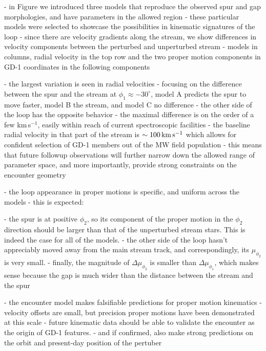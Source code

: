 \documentclass[12pt, modern]{aastex62}
\begin{document}
- in Figure we introduced three models that reproduce the observed spur and gap morphologies, and have parameters in the allowed region
- these particular models were selected to showcase the possibilities in kinematic signatures of the loop
- since there are velocity gradients along the stream, we show differences in velocity components between the perturbed and unperturbed stream
- models in columns, radial velocity in the top row and the two proper motion components in GD-1 coordinates in the following components

- the largest variation is seen in radial velocities
- focusing on the difference between the spur and the stream at $\phi_1\approx-30^\circ$, model A predicts the spur to move faster, model B the stream, and model C no difference
- the other side of the loop has the opposite behavior
- the maximal difference is on the order of a few km\,s$^{-1}$, easily within reach of current spectroscopic facilities
- the baseline radial velocity in that part of the stream is $\sim100\,\rm km\,s^{-1}$ which allows for confident selection of GD-1 members out of the MW field population
- this means that future followup observations will further narrow down the allowed range of parameter space, and more importantly, provide strong constraints on the encounter geometry

- the loop appearance in proper motions is specific, and uniform across the models
- this is expected: 

- the spur is at positive $\phi_2$, so its component of the proper motion in the $\phi_2$ direction should be larger than that of the unperturbed stream stars.
This is indeed the case for all of the models.
- the other side of the loop hasn't appreciably moved away from the main stream track, and correspondingly, its $\mu_{\phi_2}$ is very small.
- finally, the magnitude of $\Delta\mu_{\phi_2}$ is smaller than $\Delta\mu_{\phi_1}$, which makes sense because the gap is much wider than the distance between the stream and the spur

- the encounter model makes falsifiable predictions for proper motion kinematics
- velocity offsets are small, but precision proper motions have been demonstrated at this scale \citep{sohn2015}
- future kinematic data should be able to validate the encounter as the origin of GD-1 features.
- and if confirmed, also make strong predictions on the orbit and present-day position of the pertuber
\end{document}
